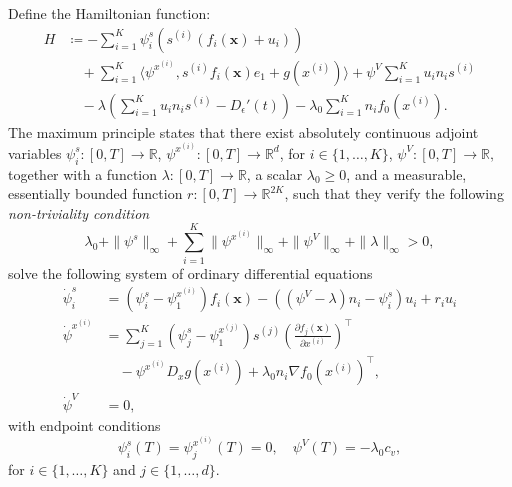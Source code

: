 \documentclass[letterpaper, 10 pt, conference]{ieeeconf}
\newcommand{\R}{\mathbb{R}}
\newcommand{\fori}[1]{#1 \in \{1,\dots, K\}}
\begin{document}
Define the Hamiltonian function:
\begin{equation}
    \begin{aligned}
    H &\coloneqq -\sum_{i=1}^K \psi^s_i \left(s^{(i)}\left(f_i(\boldsymbol{x}) + u_i\right) \right) \\
    &\quad +\sum_{i=1}^K \langle \psi^{x^{(i)}}, s^{(i)} f_i(\boldsymbol{x}) e_1 + g(x^{(i)}) \rangle + \psi^V \sum_{i=1}^K u_i n_i s^{(i)} \\
    &\quad - \lambda \left(\sum_{i=1}^K u_i n_i s^{(i)} - D_{\epsilon}'(t)\right) - \lambda_0 \sum_{i=1}^K n_i f_0(x^{(i)}).
    \end{aligned}
\end{equation}
The maximum principle states that there exist absolutely continuous adjoint variables $\psi_i^s:[0, T]\to\mathbb{R}$, $\psi^{x^{(i)}}: [0, T]\to\mathbb{R}^d$, for $\fori{i}$, $\psi^V: [0 ,T]\to\mathbb{R},$ together with a function $\lambda:[ 0,T] \to \mathbb{R}$, a scalar $\lambda_0 \geq 0$, and a measurable, essentially bounded function $r: [0, T] \to \R^{2K}$, such that they verify the following {\it non-triviality condition}
\begin{equation}
    \lambda_0 + \|\psi^s\|_{\infty} + \sum_{i=1}^{K} \|\psi^{x^{(i)}}\|_{\infty} + \|\psi^V\|_{\infty} + \|\lambda\|_{\infty} > 0, 
    \label{eq:nondegeneracy}
\end{equation}
solve the following system of ordinary differential equations
\begin{equation}
    \begin{aligned}
        \dot\psi_i^s &= (\psi^s_i - \psi^{x^{(i)}}_1) f_i(\boldsymbol{x})
        - ((\psi^V - \lambda) n_i - \psi_i^s) u_i + r_i u_i \\
        \dot\psi^{x^{(i)}} &= \sum_{j=1}^K (\psi_j^s - \psi_1^{x^{(j)}}) s^{(j)} \left(\frac{\partial f_j(\boldsymbol{x})}{\partial x^{(i)}} \right)^{\top}
        \\ 
            &\quad - \psi^{x^{(i)}} D_x g(x^{(i)}) + \lambda_0 n_i \nabla f_0\left(x^{(i)}\right)^{\top}, \\
        \dot\psi^V &= 0,
    \end{aligned}
    \label{eq:adjoint_system}
\end{equation}
with endpoint conditions
\begin{equation}
    \psi^s_i(T) = \psi^{x^{(i)}}_j(T) = 0, \quad \psi^V(T) = -\lambda_0 c_v,
\end{equation}
for $i\in\{1,\dots,K\}$ and $j\in\{1,\dots,d\}$.
\end{document}
